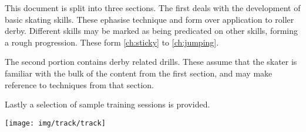 This document is split into three sections. The first deals with the development of basic skating skills.  
These ephasise technique and form over application to roller derby.
Different skills may be marked as being predicated on other skills, forming a rough progression. 
These form \cref{ch:sticky} to \cref{ch:jumping}. 


The second portion contains derby related drills.
These assume that the skater is familiar with the bulk of the content from the first section, and may make reference to techniques from that section.  


Lastly a selection of sample training sessions is provided. 

\vspace{2cm}

\begin{center}
\texttt{[image: img/track/track]}
\end{center}




